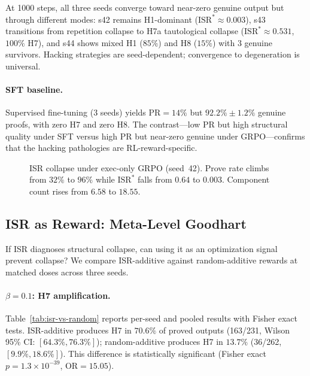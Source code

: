 At 1000 steps, all three seeds converge toward near-zero genuine output but through different modes: s42 remains H1-dominant ($\mathrm{ISR}^*{\approx}0.003$), s43 transitions from repetition collapse to H7a tautological collapse ($\mathrm{ISR}^*{\approx}0.531$, $100\%$ H7), and s44 shows mixed H1 ($85\%$) and H8 ($15\%$) with 3 genuine survivors.
Hacking strategies are seed-dependent; convergence to degeneration is universal.

\paragraph{SFT baseline.}
Supervised fine-tuning (3 seeds) yields $\mathrm{PR}{=}14\%$ but $92.2\%{\pm}1.2\%$ genuine proofs, with zero H7 and zero H8.
The contrast---low PR but high structural quality under SFT versus high PR but near-zero genuine under GRPO---confirms that the hacking pathologies are RL-reward-specific.

\begin{figure}[t]
  \centering
  \caption{ISR collapse under exec-only GRPO (seed~42). Prove rate climbs from $32\%$ to $96\%$ while $\mathrm{ISR}^*$ falls from $0.64$ to $0.003$. Component count rises from $6.58$ to $18.55$.}
  \label{fig:isr-collapse}
\end{figure}

\subsection{ISR as Reward: Meta-Level Goodhart}
\label{sec:exp-goodhart}

If ISR diagnoses structural collapse, can using it as an optimization signal prevent collapse?
We compare ISR-additive against random-additive rewards at matched doses across three seeds.

\paragraph{$\beta{=}0.1$: H7 amplification.}
Table~\ref{tab:isr-vs-random} reports per-seed and pooled results with Fisher exact tests.
ISR-additive produces H7 in $70.6\%$ of proved outputs (163/231, Wilson 95\% CI: $[64.3\%, 76.3\%]$); random-additive produces H7 in $13.7\%$ (36/262, $[9.9\%, 18.6\%]$).
This difference is statistically significant (Fisher exact $p = 1.3 \times 10^{-39}$, OR${=}15.05$).


